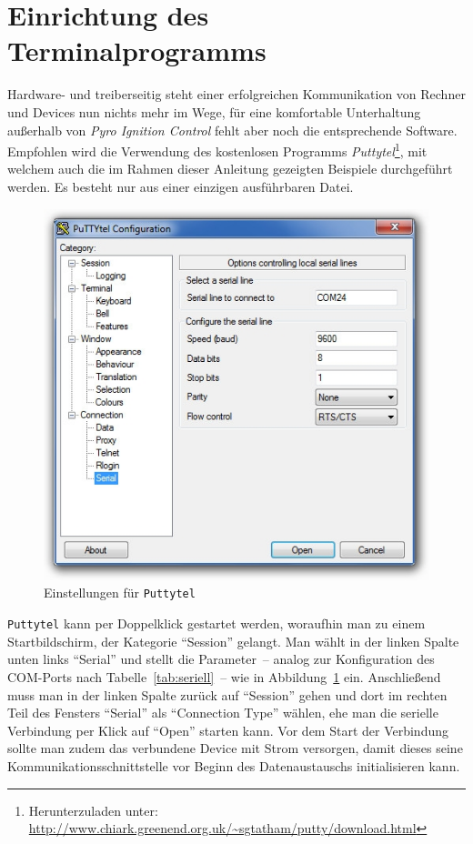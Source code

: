 \documentclass[paper=a4, parskip, numbers=noenddot, toc=listof, headsepline]{scrbook}
\newcommand{\pic}{\emph{Pyro Ignition Control}}
\begin{document}
		\section{Einrichtung des Terminalprogramms}

			Hardware- und treiberseitig steht einer erfolgreichen Kommunikation von Rechner und Devices nun nichts mehr im Wege, für eine komfortable Unterhaltung außerhalb von {\pic} fehlt aber noch die entsprechende Software. Empfohlen wird die Verwendung des kostenlosen Programms \emph{Puttytel}\footnote{Herunterzuladen unter: \url{http://www.chiark.greenend.org.uk/~sgtatham/putty/download.html}}, mit welchem auch die im Rahmen dieser Anleitung gezeigten Beispiele durchgeführt werden. Es besteht nur aus einer einzigen ausführbaren Datei.

			\begin{figure}
				\centering
				\includegraphics[width=.75\textwidth]{Bilder/puttytelstart}
				\caption{Einstellungen für \texttt{Puttytel}}
				\label{fig:puttytelstart}
			\end{figure}

			\texttt{Puttytel} kann per Doppelklick gestartet werden, woraufhin man zu einem Startbildschirm, der Kategorie \enquote{Session} gelangt. Man wählt in der linken Spalte unten links \enquote{Serial} und stellt die Parameter~-- analog zur Konfiguration des COM-Ports nach Tabelle~\ref{tab:seriell}~-- wie in Abbildung~\ref{fig:puttytelstart} ein. Anschließend muss man in der linken Spalte zurück auf \enquote{Session} gehen und dort im rechten Teil des Fensters \enquote{Serial} als \enquote{Connection Type} wählen, ehe man die serielle Verbindung per Klick auf \enquote{Open} starten kann. Vor dem Start der Verbindung sollte man zudem das verbundene Device mit Strom versorgen, damit dieses seine Kommunikationsschnittstelle vor Beginn des Datenaustauschs initialisieren kann.
\end{document}
